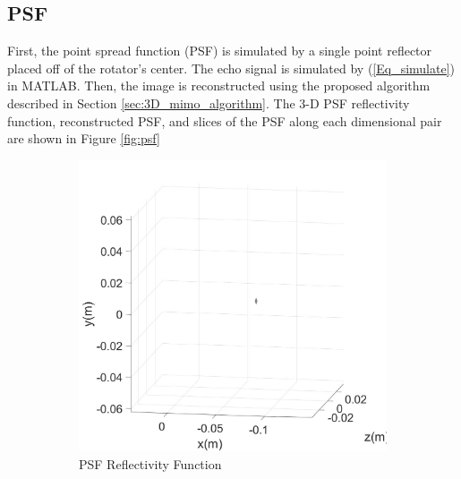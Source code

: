 \documentclass[conference]{IEEEtran}
\begin{document}
		\subsection{PSF}
			
		First, the point spread function (PSF) is simulated by a single point reflector placed off of the rotator's center. The echo signal is simulated by (\ref{Eq_simulate}) in MATLAB. Then, the image is reconstructed using the proposed algorithm described in Section \ref{sec:3D_mimo_algorithm}. The 3-D PSF reflectivity function, reconstructed PSF, and slices of the PSF along each dimensional pair are shown in Figure \ref{fig:psf}
		
		\begin{figure} [h]
			\begin{subfigure}{.5\linewidth}
				\centering
				\includegraphics[width=1\linewidth]{../MatlabResults/CSAR_PSF_input}
				\caption{PSF Reflectivity Function}
				\label{fig:psf_in}
			\end{subfigure}%
			\begin{subfigure}{.5\linewidth}
				\label{fig:psf_out}
				\centering

\end{subfigure}
\end{figure}
\end{document}
